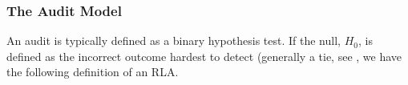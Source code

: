 


\subsubsection{The Audit Model}
An audit is typically defined as a binary hypothesis test. If the null, $H_0$, is defined as the incorrect outcome hardest to detect (generally a tie, see \cite{Bayesian-RLA}, we have the following definition of an RLA. 

